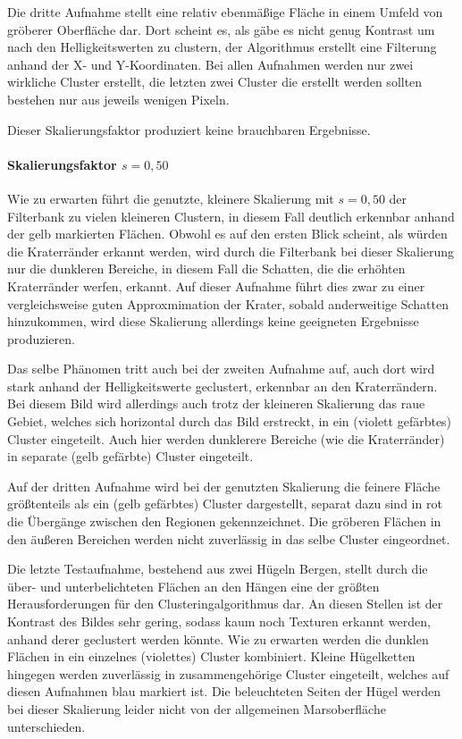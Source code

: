 Die dritte Aufnahme stellt eine relativ ebenmäßige Fläche in einem Umfeld von gröberer Oberfläche dar. Dort scheint es, als gäbe es nicht genug Kontrast um nach den Helligkeitswerten zu clustern, der Algorithmus erstellt eine Filterung anhand der X- und Y-Koordinaten. Bei allen Aufnahmen werden nur zwei wirkliche Cluster erstellt, die letzten zwei Cluster die erstellt werden sollten bestehen nur aus jeweils wenigen Pixeln.

Dieser Skalierungsfaktor produziert keine brauchbaren Ergebnisse.

\paragraph{Skalierungsfaktor $s=0,50$}

Wie zu erwarten führt die genutzte, kleinere Skalierung mit $s=0,50$ der Filterbank zu vielen kleineren Clustern, in diesem Fall deutlich erkennbar anhand der gelb markierten Flächen. Obwohl es auf den ersten Blick scheint, als würden die Kraterränder erkannt werden, wird durch die Filterbank bei dieser Skalierung nur die dunkleren Bereiche, in diesem Fall die Schatten, die die erhöhten Kraterränder werfen, erkannt. Auf dieser Aufnahme führt dies zwar zu einer vergleichsweise guten Approxmimation der Krater, sobald anderweitige Schatten hinzukommen, wird diese Skalierung allerdings keine geeigneten Ergebnisse produzieren.

Das selbe Phänomen tritt auch bei der zweiten Aufnahme auf, auch dort wird stark anhand der Helligkeitswerte geclustert, erkennbar an den Kraterrändern. Bei diesem Bild wird allerdings auch trotz der kleineren Skalierung das raue Gebiet, welches sich horizontal durch das Bild erstreckt, in ein (violett gefärbtes) Cluster eingeteilt. Auch hier werden dunklerere Bereiche (wie die Kraterränder) in separate (gelb gefärbte) Cluster eingeteilt.

Auf der dritten Aufnahme wird bei der genutzten Skalierung die feinere Fläche größtenteils als ein (gelb gefärbtes) Cluster dargestellt, separat dazu sind in rot die Übergänge zwischen den Regionen gekennzeichnet. Die gröberen Flächen in den äußeren Bereichen werden nicht zuverlässig in das selbe Cluster eingeordnet.

Die letzte Testaufnahme, bestehend aus zwei Hügeln \bzw Bergen, stellt durch die über- und unterbelichteten Flächen an den Hängen eine der größten Herausforderungen für den Clusteringalgorithmus dar. An diesen Stellen ist der Kontrast des Bildes sehr gering, sodass kaum noch Texturen erkannt werden, anhand derer geclustert werden könnte. Wie zu erwarten werden die dunklen Flächen in ein einzelnes (violettes) Cluster kombiniert. Kleine Hügelketten hingegen werden zuverlässig in zusammengehörige Cluster eingeteilt, welches auf diesen Aufnahmen blau markiert ist. Die beleuchteten Seiten der Hügel werden bei dieser Skalierung leider nicht von der allgemeinen Marsoberfläche unterschieden.

